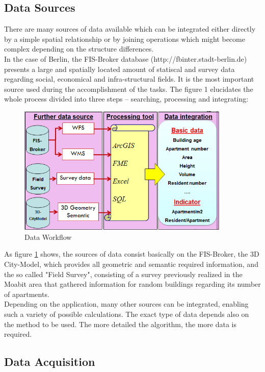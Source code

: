\subsection{Data Sources}
There are many sources of data available which can be integrated either directly by a simple spatial relationship or by joining operations which might become complex depending on the structure differences.\\ 
In the case of Berlin, the FIS-Broker database (http://fbinter.stadt-berlin.de) presents a large and spatially located amount of statiscal and survey data regarding social, economical and infra-structural fields. It is the most important source used during the accomplishment of the tasks.
The figure 1 elucidates the whole process divided into three steps – searching, processing and integrating:\\
\begin{figure}[ht]
	\centering
	\includegraphics[width=0.9\textwidth]{phase1/group3/fig1.png}
	\caption{Data Workflow}
	\label{fig:figure1}
\end{figure}
As figure \ref{fig:figure1} shows, the sources of data consist basically on the FIS-Broker, the 3D City-Model, which provides all geometric and semantic required information, and the so called "Field Survey", consisting of a survey previously realized in the Moabit area that gathered information for random buildings regarding its number of apartments. \\
Depending on the application, many other sources can be integrated, enabling such a variety of possible calculations. The exact type of data depends also on the method to be used. The more detailed the algorithm, the more data is required. 
\subsection{Data Acquisition }
